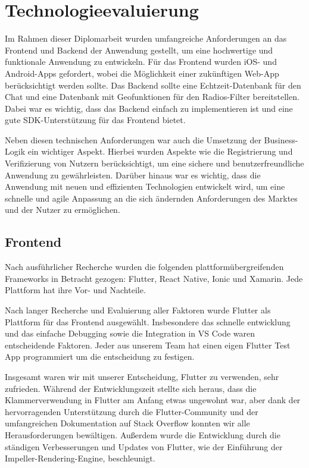 \section{Technologieevaluierung}

Im Rahmen dieser Diplomarbeit wurden umfangreiche Anforderungen an das Frontend und Backend der Anwendung gestellt, um eine hochwertige und funktionale Anwendung zu entwickeln. Für das Frontend wurden iOS- und Android-Apps gefordert, wobei die Möglichkeit einer zukünftigen Web-App berücksichtigt werden sollte. Das Backend sollte eine Echtzeit-Datenbank für den Chat und eine Datenbank mit Geofunktionen für den Radios-Filter bereitstellen. Dabei war es wichtig, dass das Backend einfach zu implementieren ist und eine gute SDK-Unterstützung für das Frontend bietet.

Neben diesen technischen Anforderungen war auch die Umsetzung der Business-Logik ein wichtiger Aspekt. Hierbei wurden Aspekte wie die Registrierung und Verifizierung von Nutzern berücksichtigt, um eine sichere und benutzerfreundliche Anwendung zu gewährleisten. Darüber hinaus war es wichtig, dass die Anwendung mit neuen und effizienten Technologien entwickelt wird, um eine schnelle und agile Anpassung an die sich ändernden Anforderungen des Marktes und der Nutzer zu ermöglichen.


\subsection{Frontend}

Nach ausführlicher Recherche wurden die folgenden plattformübergreifenden Frameworks in Betracht gezogen\cite{cross_platform_framework_comparison}: Flutter, React Native, Ionic und Xamarin. Jede Plattform hat ihre Vor- und Nachteile.




Nach langer Recherche und Evaluierung aller Faktoren wurde Flutter als Plattform für das Frontend ausgewählt. Insbesondere das schnelle entwicklung und das einfache Debugging sowie die Integration in VS Code waren entscheidende Faktoren. Jeder aus unserem Team hat einen eigen Flutter Test App programmiert \cite{flutter_test_apps} um die entscheidung zu festigen.

Insgesamt waren wir mit unserer Entscheidung, Flutter zu verwenden, sehr zufrieden. Während der Entwicklungszeit stellte sich heraus, dass die Klammerverwendung in Flutter am Anfang etwas ungewohnt war, aber dank der hervorragenden Unterstützung durch die Flutter-Community und der umfangreichen Dokumentation auf Stack Overflow konnten wir alle Herausforderungen bewältigen. Außerdem wurde die Entwicklung durch die ständigen Verbesserungen und Updates von Flutter, wie der Einführung der Impeller-Rendering-Engine, beschleunigt. \cite{flutter_impeller}

